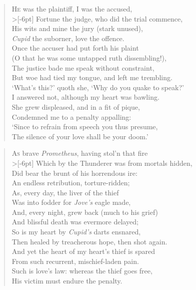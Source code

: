 \documentclass[a5paper, 12pt, oneside]{memoir}
\begin{document}
\PoemTitle{}
\begin{verse}
    \lettrine{H}{e} was the plaintiff, I was the accused, \\>[-6pt]
    Fortune the judge, who did the trial commence, \\
    His wits and mine the jury (stark unused), \\
    \textit{Cupid} the suborner, love the offence. \\
    Once the accuser had put forth his plaint \\
    (O that he was some untapped ruth dissembling!), \\
    The justice bade me speak without constraint, \\
    But woe had tied my tongue, and left me trembling. \\
    `What's this?' quoth she, `Why do you quake to speak?' \\
    I answered not, although my heart was bawling. \\
    She grew displeased, and in a fit of pique, \\
    Condemned me to a penalty appalling: \\
    \vin `Since to refrain from speech you thus presume, \\
    \vin The silence of your love shall be your doom.'
\end{verse}

\PoemTitle{}
\begin{verse}
    \lettrine{A}{s} brave \textit{Prometheus}, having stol'n that fire \\>[-6pt]
    Which by the Thunderer was from mortals hidden, \\
    Did bear the brunt of his horrendous ire: \\
    An endless retribution, torture-ridden; \\
    As, every day, the liver of the thief \\
    Was into fodder for \textit{Jove's} eagle made, \\
    And, every night, grew back (much to his grief) \\
    And blissful death was evermore delayed; \\
    So is my heart by \textit{Cupid's} darts ensnared, \\
    Then healed by treacherous hope, then shot again. \\
    And yet the heart of my heart's thief is spared \\
    From such recurrent, mischief-laden pain. \\
    \vin Such is love's law: whereas the thief goes free, \\
    \vin His victim must endure the penalty. 
\end{verse}
\end{document}
